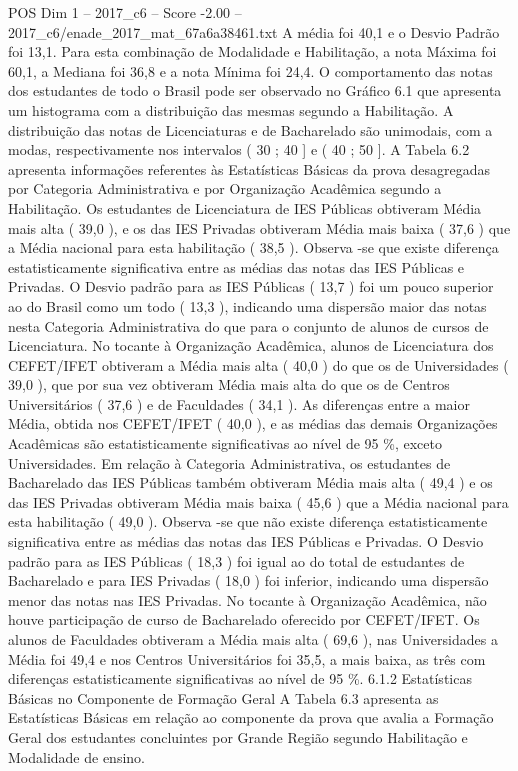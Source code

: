 \begin{textsample}{POS Dim 1 – 2017\_c6 – Score -2.00 – 2017\_c6/enade\_2017\_mat\_67a6a38461.txt}
A média foi 40,1 e o Desvio Padrão foi 13,1.
Para esta combinação de Modalidade e Habilitação, a nota Máxima foi 60,1, a Mediana foi 36,8 e a nota Mínima foi 24,4.
O comportamento das notas dos estudantes de todo o Brasil pode ser observado no Gráfico 6.1 que apresenta um histograma com a distribuição das mesmas segundo a Habilitação.
A distribuição das notas de Licenciaturas e de Bacharelado são unimodais, com a modas, respectivamente nos intervalos ( 30 ; 40 ] e ( 40 ; 50 ].
A Tabela 6.2 apresenta informações referentes às Estatísticas Básicas da prova desagregadas por Categoria Administrativa e por Organização Acadêmica segundo a Habilitação.
Os estudantes de Licenciatura de IES Públicas obtiveram Média mais alta ( 39,0 ), e os das IES Privadas obtiveram Média mais baixa ( 37,6 ) que a Média nacional para esta habilitação ( 38,5 ).
Observa -se que existe diferença estatisticamente significativa entre as médias das notas das IES Públicas e Privadas.
O Desvio padrão para as IES Públicas ( 13,7 ) foi um pouco superior ao do Brasil como um todo ( 13,3 ), indicando uma dispersão maior das notas nesta Categoria Administrativa do que para o conjunto de alunos de cursos de Licenciatura.
No tocante à Organização Acadêmica, alunos de Licenciatura dos CEFET/IFET obtiveram a Média mais alta ( 40,0 ) do que os de Universidades ( 39,0 ), que por sua vez obtiveram Média mais alta do que os de Centros Universitários ( 37,6 ) e de Faculdades ( 34,1 ).
As diferenças entre a maior Média, obtida nos CEFET/IFET ( 40,0 ), e as médias das demais Organizações Acadêmicas são estatisticamente significativas ao nível de 95 \%, exceto Universidades.
Em relação à Categoria Administrativa, os estudantes de Bacharelado das IES Públicas também obtiveram Média mais alta ( 49,4 ) e os das IES Privadas obtiveram Média mais baixa ( 45,6 ) que a Média nacional para esta habilitação ( 49,0 ).
Observa -se que não existe diferença estatisticamente significativa entre as médias das notas das IES Públicas e Privadas.
O Desvio padrão para as IES Públicas ( 18,3 ) foi igual ao do total de estudantes de Bacharelado e para IES Privadas ( 18,0 ) foi inferior, indicando uma dispersão menor das notas nas IES Privadas.
No tocante à Organização Acadêmica, não houve participação de curso de Bacharelado oferecido por CEFET/IFET.
Os alunos de Faculdades obtiveram a Média mais alta ( 69,6 ), nas Universidades a Média foi 49,4 e nos Centros Universitários foi 35,5, a mais baixa, as três com diferenças estatisticamente significativas ao nível de 95 \%. 6.1.2 Estatísticas Básicas no Componente de Formação Geral A Tabela 6.3 apresenta as Estatísticas Básicas em relação ao componente da prova que avalia a Formação Geral dos estudantes concluintes por Grande Região segundo Habilitação e Modalidade de ensino.

\end{textsample}
